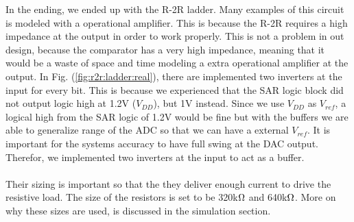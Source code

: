 \documentclass[english, 12pt, a4paper]{ifimaster}
\begin{document}
\newline
In the ending, we ended up with the R-2R ladder. Many examples of this circuit is modeled with a operational amplifier. This is because the R-2R requires a high impedance at the output in order to
work properly. This is not a problem in out design, because the comparator has a very high impedance, meaning that it would be a waste of space and time modeling a extra operational amplifier at
the output. In Fig. (\ref{fig:r2r:ladder:real}), there are implemented two inverters at the input for every bit. This is because we experienced that the SAR logic block did not output logic high at
1.2V (\(V_{DD}\)), but 1V instead. Since we use \(V_{DD}\) as \(V_{ref}\), a logical high from the SAR logic of 1.2V would be fine but with the buffers we are able to generalize range of the ADC so that we can have a external \(V_{ref}\).
It is important for the systems accuracy to have full swing at the DAC output. Therefor, we implemented two inverters at the input to act as a buffer.\\ 
\\
Their sizing is important so that the they deliver enough current to drive the resistive load.
The size of the resistors is set to be 320k\(\ohm\) and 640k\(\ohm\). More on why these sizes are used, is discussed in the simulation section. 
\end{document}
